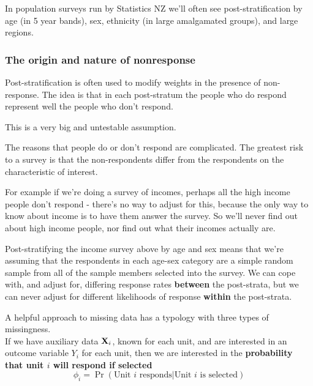 \documentclass[
]{book}
\begin{document}
In population surveys run by Statistics NZ we'll often see post-stratification by age
(in 5 year bands), sex, ethnicity (in large amalgamated groups), and large regions.

\subsubsection*{The origin and nature of nonresponse}\label{the-origin-and-nature-of-nonresponse}

Post-stratification is often used to modify weights in the presence of non-response.
The idea is that in each post-stratum the people who do respond represent well the people
who don't respond.

This is a very big and untestable assumption.

The reasons that people do or don't respond are complicated. The greatest risk to a
survey is that the non-respondents differ from the respondents on the characteristic
of interest.

For example if we're doing a survey of incomes, perhaps all the high income
people don't respond - there's no way to adjust for this, because the only way to know about
income is to have them answer the survey. So we'll never find out about high income people,
nor find out what their incomes actually are.

Post-stratifying the income survey above by age and sex means that we're assuming that
the respondents in each age-sex category are a simple random sample from all of the
sample members selected into the survey. We can cope with, and adjust for, differing response rates
\textbf{between} the post-strata, but we can never adjust for different likelihoods of response
\textbf{within} the post-strata.

A helpful approach to missing data has a typology with three types of missingness.\\
If we have auxiliary data \({\bf X}_i\), known for each unit, and are interested in an outcome
variable \(Y_i\) for each unit, then we are interested in the \textbf{probability that unit \(i\)
will respond if selected}
\[
   \phi_i = \Pr(\text{Unit $i$ responds} | \text{Unit $i$ is selected})
\]
\end{document}
